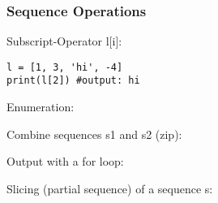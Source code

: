 \subsubsection{Sequence Operations}
Subscript-Operator l[i]:
\begin{lstlisting}
l = [1, 3, 'hi', -4]
print(l[2]) #output: hi
\end{lstlisting}
Enumeration:

Combine sequences s1 and s2 (zip):

Output with a for loop:

Slicing (partial sequence) of a sequence s:
